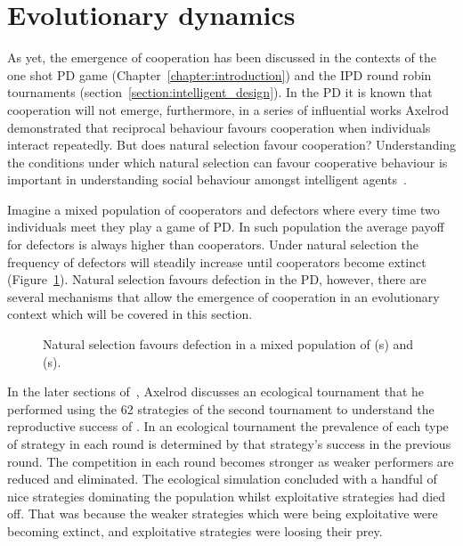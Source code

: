 \section{Evolutionary dynamics}\label{section:evolutionary_dynamics}

As yet, the emergence of cooperation has been discussed in the contexts of the
one shot PD game (Chapter~\ref{chapter:introduction}) and the IPD round robin
tournaments (section~\ref{section:intelligent_design}). In the PD it is
known that cooperation will not emerge, furthermore, in a series of influential works
Axelrod demonstrated that reciprocal behaviour favours cooperation when
individuals interact repeatedly. But does natural selection favour cooperation?
Understanding the conditions under which natural selection can favour
cooperative behaviour is important in understanding social behaviour amongst
intelligent agents~\cite{Boyd1987}.

Imagine a mixed population of cooperators and defectors where every
time two individuals meet they play a game of PD. In such population the average
payoff for defectors is always higher than cooperators. Under natural selection
the frequency of defectors will steadily increase until cooperators become
extinct (Figure~\ref{fig:natural_selection_diagram}).
Natural selection favours defection in the PD, however, there are several mechanisms
that allow the emergence of cooperation in an evolutionary context which will be
covered in this section.

\begin{figure}[!hbtp]
    \centering
    
    \caption{Natural selection favours defection in a mixed population of \Cooperator(s)
    and \Defector(s).}\label{fig:natural_selection_diagram}
\end{figure}

In the later sections of~\cite{Axelrod1980b}, Axelrod discusses an
ecological tournament that he performed using the 62 strategies of the second
tournament to understand the reproductive success of \TitForTat. In an
ecological tournament the prevalence of each type of strategy in each round is
determined by that strategy's success in the previous round. The competition in
each round becomes stronger as weaker performers are reduced and
eliminated. The ecological simulation concluded with a handful of nice
strategies dominating the population whilst exploitative strategies had died off.
That was because the weaker strategies which were being exploitative were becoming
extinct, and exploitative strategies were loosing their prey.

